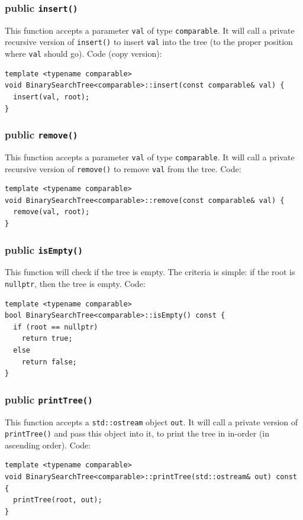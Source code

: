 \documentclass[11pt]{book}
\begin{document}
\subsubsection{public \texttt{insert()}}
\label{sec:orgdb79281}
This function accepts a parameter \texttt{val} of type \texttt{comparable}. It will call a private recursive version of \texttt{insert()} to insert \texttt{val} into the tree (to the proper position where \texttt{val} should go). Code (copy version):
\begin{verbatim}
template <typename comparable>
void BinarySearchTree<comparable>::insert(const comparable& val) {
  insert(val, root);
}
\end{verbatim}

\subsubsection{public \texttt{remove()}}
\label{sec:org68e4978}
This function accepts a parameter \texttt{val} of type \texttt{comparable}. It will call a private recursive version of \texttt{remove()} to remove \texttt{val} from the tree. Code:
\begin{verbatim}
template <typename comparable>
void BinarySearchTree<comparable>::remove(const comparable& val) {
  remove(val, root);
}
\end{verbatim}

\subsubsection{public \texttt{isEmpty()}}
\label{sec:org0c77c8c}
This function will check if the tree is empty. The criteria is simple: if the root is \texttt{nullptr}, then the tree is empty. Code:
\begin{verbatim}
template <typename comparable>
bool BinarySearchTree<comparable>::isEmpty() const {
  if (root == nullptr)
    return true;
  else 
    return false;
}
\end{verbatim}

\subsubsection{public \texttt{printTree()}}
\label{sec:org84fc3d4}
This function accepts a \texttt{std::ostream} object \texttt{out}. It will call a private version of \texttt{printTree()} and pass this object into it, to print the tree in in-order (in ascending order). Code:
\begin{verbatim}
template <typename comparable>
void BinarySearchTree<comparable>::printTree(std::ostream& out) const {
  printTree(root, out);
} 
\end{verbatim}
\end{document}
